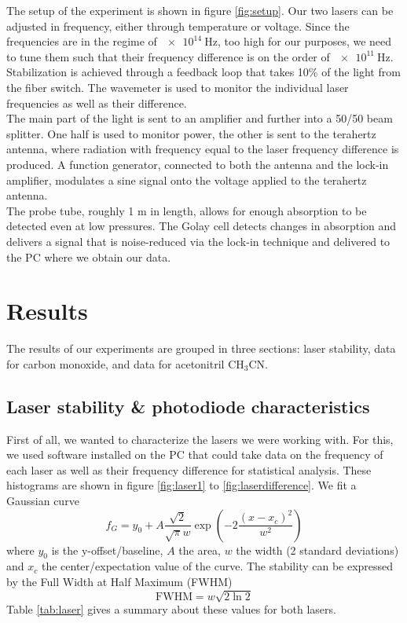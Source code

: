 \documentclass[a4paper,10pt]{scrartcl}
\begin{document}
The setup of the experiment is shown in figure \ref{fig:setup}. Our two lasers can be adjusted in frequency, either through temperature or voltage. Since the frequencies are in the regime of $\SI{e14}{\hertz}$, too high for our purposes, we need to tune them such that their frequency difference is on the order of $\SI{e11}{\hertz}$. \\
Stabilization is achieved through a feedback loop that takes 10\% of the light from the fiber switch. The wavemeter is used to monitor the individual laser frequencies as well as their difference.\\
The main part of the light is sent to an amplifier and further into a 50/50 beam splitter. One half is used to monitor power, the other is sent to the terahertz antenna, where radiation with frequency equal to the laser frequency difference is produced. A function generator, connected to both the antenna and the lock-in amplifier, modulates a sine signal onto the voltage applied to the terahertz antenna.\\
The probe tube, roughly 1 m in length, allows for enough absorption to be detected even at low pressures. The Golay cell detects changes in absorption and delivers a signal that is noise-reduced via the lock-in technique and delivered to the PC where we obtain our data. 

\section{Results}

The results of our experiments are grouped in three sections: laser stability, data for carbon monoxide, and data for acetonitril CH$_3$CN.

\subsection{Laser stability \& photodiode characteristics}

First of all, we wanted to characterize the lasers we were working with. For this, we used software installed on the PC that could take data on the frequency of each laser as well as their frequency difference for statistical analysis. These histograms are shown in figure \ref{fig:laser1} to \ref{fig:laserdifference}. We fit a Gaussian curve
\begin{equation}
f_G = y_0 + A \frac{\sqrt{2}}{\sqrt{\pi} w} \exp\left( -2 \frac{(x-x_c)^2}{w^2}\right)
\end{equation}
where $y_0$ is the y-offset/baseline, $A$ the area, $w$ the width (2 standard deviations) and $x_c$ the center/expectation value of the curve. The stability can be expressed by the Full Width at Half Maximum (FWHM)
\begin{equation}
\text{FWHM} = w \sqrt{2 \ln 2}
\end{equation}
Table \ref{tab:laser} gives a summary about these values for both lasers.
\end{document}

